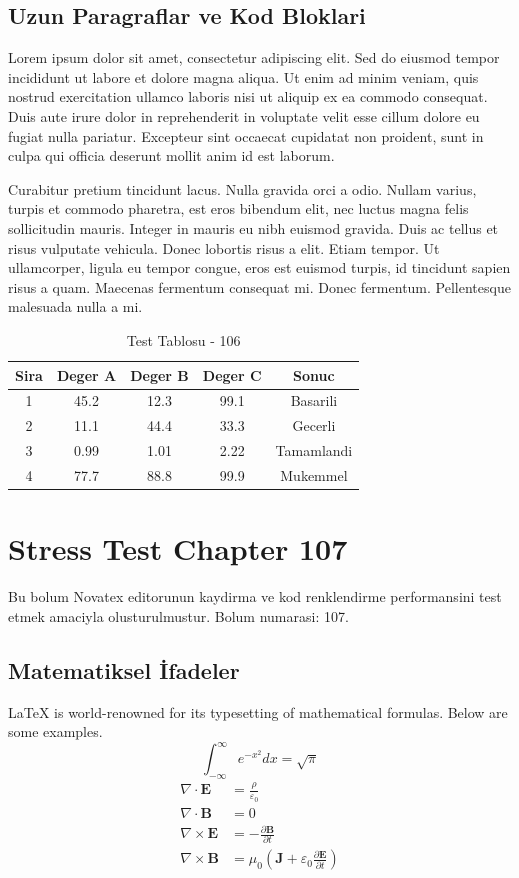 \documentclass[12pt,a4paper]{article}
\begin{document}
\subsection{Uzun Paragraflar ve Kod Bloklari}
Lorem ipsum dolor sit amet, consectetur adipiscing elit. Sed do eiusmod tempor incididunt ut labore et dolore magna aliqua. Ut enim ad minim veniam, quis nostrud exercitation ullamco laboris nisi ut aliquip ex ea commodo consequat. Duis aute irure dolor in reprehenderit in voluptate velit esse cillum dolore eu fugiat nulla pariatur. Excepteur sint occaecat cupidatat non proident, sunt in culpa qui officia deserunt mollit anim id est laborum.

Curabitur pretium tincidunt lacus. Nulla gravida orci a odio. Nullam varius, turpis et commodo pharetra, est eros bibendum elit, nec luctus magna felis sollicitudin mauris. Integer in mauris eu nibh euismod gravida. Duis ac tellus et risus vulputate vehicula. Donec lobortis risus a elit. Etiam tempor. Ut ullamcorper, ligula eu tempor congue, eros est euismod turpis, id tincidunt sapien risus a quam. Maecenas fermentum consequat mi. Donec fermentum. Pellentesque malesuada nulla a mi.

\begin{table}[h!]
\centering
\begin{tabular}{|c|c|c|c|c|}
\hline
\textbf{Sira} & \textbf{Deger A} & \textbf{Deger B} & \textbf{Deger C} & \textbf{Sonuc} \\
\hline
1 & 45.2 & 12.3 & 99.1 & Basarili \\
2 & 11.1 & 44.4 & 33.3 & Gecerli \\
3 & 0.99 & 1.01 & 2.22 & Tamamlandi \\
4 & 77.7 & 88.8 & 99.9 & Mukemmel \\
\hline
\end{tabular}
\caption{Test Tablosu - 106}
\end{table}

\newpage
\section{Stress Test Chapter 107}
Bu bolum Novatex editorunun kaydirma ve kod renklendirme performansini test etmek amaciyla olusturulmustur. Bolum numarasi: 107.

\subsection{Matematiksel İfadeler}
\LaTeX{} is world-renowned for its typesetting of mathematical formulas. Below are some examples.
\begin{equation}
\int_{-\infty}^{\infty} e^{-x^2} dx = \sqrt{\pi}
\end{equation}
\begin{align}
\nabla \cdot \mathbf{E} &= \frac{\rho}{\varepsilon_0} \\
\nabla \cdot \mathbf{B} &= 0 \\
\nabla \times \mathbf{E} &= -\frac{\partial \mathbf{B}}{\partial t} \\
\nabla \times \mathbf{B} &= \mu_0\left(\mathbf{J} + \varepsilon_0 \frac{\partial \mathbf{E}}{\partial t}\right)
\end{align}
\end{document}
